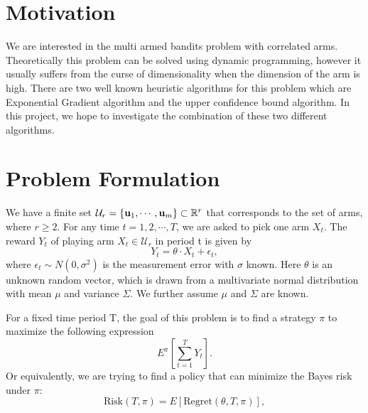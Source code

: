 \documentclass{article}
\theoremstyle{plain}
\theoremstyle{definition}
\begin{document}
 


\section{Motivation}
We are interested in the multi armed bandits problem with correlated arms. Theoretically this problem can be solved using dynamic programming, however it usually suffers from the curse of dimensionality when the dimension of the arm is high. There are two well known heuristic algorithms for this problem which are Exponential Gradient algorithm and the upper confidence bound algorithm. In this project, we hope to investigate the combination of these two different algorithms.


\section{Problem Formulation}
We have a finite set $\mathcal{U}_{r}=\{\bold{u}_{1},\cdots,\bold{u}_{m}\}\subset \mathbb{R}^{r}$ that corresponds to the set of arms, where $r\geq 2$. For any time $t=1,2,\cdots,T$, we are asked to pick one arm $X_{t}$. The reward $Y_{t}$ of playing arm $X_{t}\in \mathcal{U}_{r}$ in period t is given by
\begin{equation}
Y_{t} = \theta \cdot X_{t} + \epsilon_{t}, \nonumber
\end{equation}
where $\epsilon_{t}\sim N(0,\sigma^{2})$ is the measurement error with $\sigma$ known. Here $\theta$ is an unknown random vector, which is drawn from a multivariate normal distribution with mean $\mu$ and variance $\Sigma$. We further assume $\mu$ and $\Sigma$ are known.

For a fixed time period T, the goal of this problem is to find a strategy $\pi$ to maximize the following expression
\begin{equation}
E^{\pi}\left[\sum_{t=1}^{T} Y_{t}\right].
\end{equation}
Or equivalently, we are trying to find a policy that can minimize the Bayes risk under $\pi$:
\begin{equation}
\text{Risk}(T,\pi) = E\left[\text{Regret}(\theta,T,\pi)\right],
\end{equation}
\end{document}
